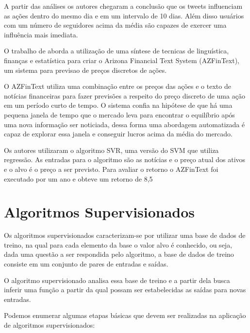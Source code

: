 A partir das análises os autores chegaram a conclusão que os tweets influenciam as ações dentro do mesmo dia e em um intervalo de 10 dias. Além disso usuários com um número de seguidores acima da média são capazes de exercer uma influência mais imediata.

O trabalho de \cite{SchumakerChen2010} aborda a utilização de uma síntese de tecnicas de linguística, finanças e estatística para criar o Arizona Financial Text System (AZFinText), um sistema para previsao de preços discretos de ações.

O AZFinText utiliza uma combinação entre os preços das ações e o texto de notícias financeiras para fazer previsões a respeito do preço discreto de uma ação em um período curto de tempo. O sistema confia na hipótese de que há uma pequena janela de tempo que o mercado leva para encontrar o equilíbrio após uma nova informação ser noticiada, dessa forma uma abordagem automatizada é capaz de explorar essa janela e conseguir lucros acima da média do mercado.

Os autores utilizaram o algoritmo SVR, uma versão do SVM que utiliza regressão. As entradas para o algoritmo são as notícias e o preço atual dos ativos e o alvo é o preço a ser previsto. Para avaliar o retorno o AZFinText foi executado por um ano e obteve um retorno de 8,5%

\section{Algoritmos Supervisionados}

Os algoritmos supervisionados caracterizam-se por utilizar uma base de dados de treino, na qual para cada elemento da base o valor alvo é conhecido, ou seja, dada uma questão a ser respondida pelo algoritmo, a base de dados de treino consiste em um conjunto de pares de entradas e saídas.

O algoritmo supervisionado analisa essa base de treino e a partir dela busca inferir uma função a partir da qual possam ser estabelecidas as saídas para novas entradas.

Podemos enumerar algumas etapas básicas que devem ser realizadas na aplicação de algoritmos supervisionados:

